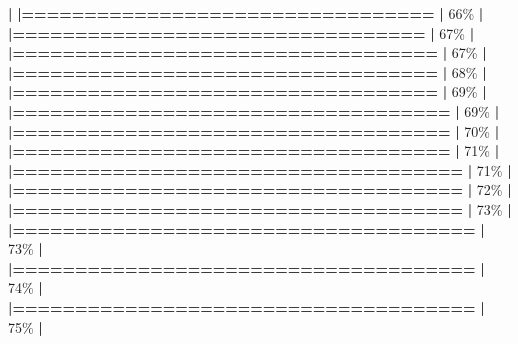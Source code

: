 \documentclass[
]{book}
\newenvironment{Shaded}{\begin{snugshade}}{\end{snugshade}}
\newcommand{\DecValTok}[1]{\textcolor[rgb]{0.00,0.00,0.81}{#1}}
\newcommand{\ErrorTok}[1]{\textcolor[rgb]{0.64,0.00,0.00}{\textbf{#1}}}
\newcommand{\NormalTok}[1]{#1}
\newcommand{\SpecialCharTok}[1]{\textcolor[rgb]{0.81,0.36,0.00}{\textbf{#1}}}
\begin{document}
\begin{Shaded}
\begin{Highlighting}[]
  \SpecialCharTok{|}                                                        
  \ErrorTok{|=================================}                 \ErrorTok{|}  \DecValTok{66}\NormalTok{\%}
  \SpecialCharTok{|}                                                        
  \ErrorTok{|=================================}                 \ErrorTok{|}  \DecValTok{67}\NormalTok{\%}
  \SpecialCharTok{|}                                                        
  \ErrorTok{|==================================}                \ErrorTok{|}  \DecValTok{67}\NormalTok{\%}
  \SpecialCharTok{|}                                                        
  \ErrorTok{|==================================}                \ErrorTok{|}  \DecValTok{68}\NormalTok{\%}
  \SpecialCharTok{|}                                                        
  \ErrorTok{|==================================}                \ErrorTok{|}  \DecValTok{69}\NormalTok{\%}
  \SpecialCharTok{|}                                                        
  \ErrorTok{|===================================}               \ErrorTok{|}  \DecValTok{69}\NormalTok{\%}
  \SpecialCharTok{|}                                                        
  \ErrorTok{|===================================}               \ErrorTok{|}  \DecValTok{70}\NormalTok{\%}
  \SpecialCharTok{|}                                                        
  \ErrorTok{|===================================}               \ErrorTok{|}  \DecValTok{71}\NormalTok{\%}
  \SpecialCharTok{|}                                                        
  \ErrorTok{|====================================}              \ErrorTok{|}  \DecValTok{71}\NormalTok{\%}
  \SpecialCharTok{|}                                                        
  \ErrorTok{|====================================}              \ErrorTok{|}  \DecValTok{72}\NormalTok{\%}
  \SpecialCharTok{|}                                                        
  \ErrorTok{|====================================}              \ErrorTok{|}  \DecValTok{73}\NormalTok{\%}
  \SpecialCharTok{|}                                                        
  \ErrorTok{|=====================================}             \ErrorTok{|}  \DecValTok{73}\NormalTok{\%}
  \SpecialCharTok{|}                                                        
  \ErrorTok{|=====================================}             \ErrorTok{|}  \DecValTok{74}\NormalTok{\%}
  \SpecialCharTok{|}                                                        
  \ErrorTok{|=====================================}             \ErrorTok{|}  \DecValTok{75}\NormalTok{\%}
  \SpecialCharTok{|}                                                        

\end{Highlighting}
\end{Shaded}
\end{document}

